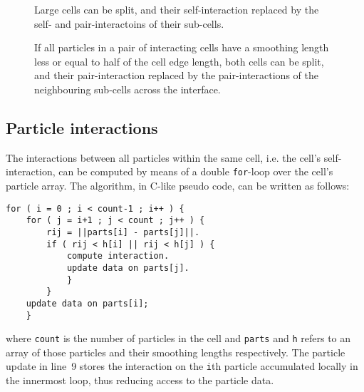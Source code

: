 \documentclass[final]{siamltex}
\begin{document}
\begin{figure}
    \centerline{}
    
    \caption{Large cells can be split, and their
        self-interaction replaced by the self- and pair-interactoins
        of their sub-cells.}
    \label{fig:SplitCell}
\end{figure}


\begin{figure}
    \centerline{}
    
    \caption{If all particles in a pair of interacting cells have a smoothing
        length less or equal to half of the cell edge length, both cells can be
        split, and their pair-interaction replaced by the pair-interactions
        of the neighbouring sub-cells across the interface.}
    \label{fig:SplitPair}
\end{figure}


\subsection{Particle interactions}

The interactions between all particles within the same cell,
i.e. the cell's self-interaction, can be computed by means of
a double {\tt for}-loop over the cell's particle array.
The algorithm, in C-like pseudo code, can be written as follows:

\begin{center}\begin{minipage}{0.8\textwidth}
    \begin{lstlisting}
for ( i = 0 ; i < count-1 ; i++ ) {
    for ( j = i+1 ; j < count ; j++ ) {
        rij = ||parts[i] - parts[j]||.
        if ( rij < h[i] || rij < h[j] ) {
            compute interaction.
            update data on parts[j].
            }
        }
    update data on parts[i];
    }
    \end{lstlisting}
\end{minipage}\end{center}

\noindent where {\tt count} is the number of particles in the
cell and {\tt parts} and {\tt h} refers to an array of those
particles and their smoothing lengths respectively.
The particle update in line~9 stores the interaction on the
{\tt i}th particle accumulated locally in the innermost loop,
thus reducing access to the particle data.
\end{document}
